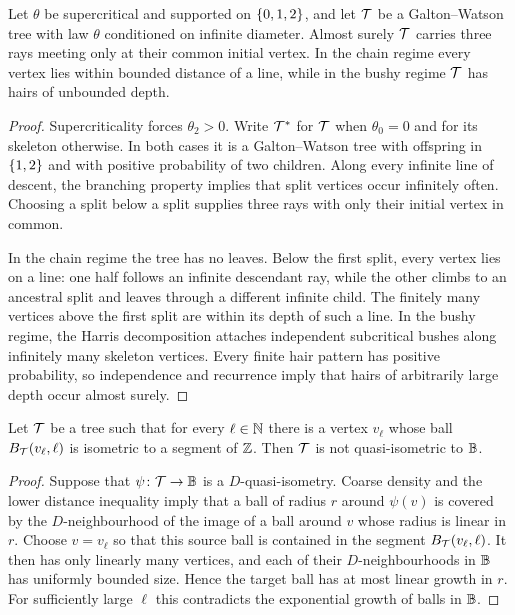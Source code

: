 \begin{lemma}
\label{thm:regime-obstructions}
\leanok
Let $\theta$ be supercritical and supported on $\{0,1,2\}$, and let $\mathcal{T}$ be a Galton--Watson
tree with law $\theta$ conditioned on infinite diameter. Almost surely $\mathcal{T}$ carries three rays
meeting only at their common initial vertex. In the chain regime every vertex lies within
bounded distance of a line, while in the bushy regime $\mathcal{T}$ has hairs of unbounded depth.
\end{lemma}

\begin{proof}
\leanok
{}
Supercriticality forces $\theta_2>0$. Write $\mathcal{T}^*$ for $\mathcal{T}$ when $\theta_0=0$ and for
its skeleton otherwise. In both cases it is a Galton--Watson tree with offspring in
$\{1,2\}$ and with positive probability of two children. Along every infinite line of descent,
the branching property implies that split vertices occur infinitely often. Choosing a split below
a split supplies three rays with only their initial vertex in common.

In the chain regime the tree has no leaves. Below the first split, every vertex lies on a line:
one half follows an infinite descendant ray, while the other climbs to an ancestral split and
leaves through a different infinite child. The finitely many vertices above the first split are
within its depth of such a line. In the bushy regime, the Harris decomposition attaches
independent subcritical bushes along infinitely many skeleton vertices. Every finite hair pattern
has positive probability, so independence and recurrence imply that hairs of arbitrarily large
depth occur almost surely.
\end{proof}

\begin{proposition}
\label{thm:bottleneck}
\leanok
Let $\mathcal{T}$ be a tree such that for every $\ell\in\mathbb{N}$ there is a vertex $v_\ell$ whose ball
$B_{\mathcal{T}}(v_\ell,\ell)$ is isometric to a segment of $\mathbb{Z}$. Then $\mathcal{T}$ is not quasi-isometric
to $\mathbb{B}$.
\end{proposition}

\begin{proof}
\leanok
{}
Suppose that $\psi\colon\mathcal{T}\to\mathbb{B}$ is a $D$-quasi-isometry. Coarse density and the lower
distance inequality imply that a ball of radius $r$ around $\psi(v)$ is covered by the
$D$-neighbourhood of the image of a ball around $v$ whose radius is linear in $r$. Choose
$v=v_\ell$ so that this source ball is contained in the segment
$B_{\mathcal{T}}(v_\ell,\ell)$. It then has only linearly many vertices, and each of their
$D$-neighbourhoods in $\mathbb{B}$ has uniformly bounded size. Hence the target ball has at most
linear growth in $r$. For sufficiently large $\ell$ this contradicts the exponential growth of
balls in $\mathbb{B}$.
\end{proof}

